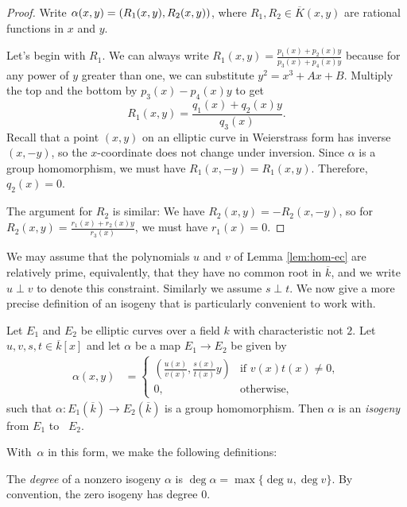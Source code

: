 \begin{proof}
Write $\alpha(x,y)=(R_1(x,y),R_2(x,y))$, where $R_1,R_2\in  \overline{K}(x,y)$ are rational functions in $x$ and $y$.

Let's begin with $R_1$.  We can always write $R_1(x,y) = \frac{p_1(x)+p_2(x)y}{p_3(x)+p_4(x)y}$ because for any power of $y$ greater than one, we can substitute $y^2 = x^3+Ax+B$.  Multiply the top and the bottom by $p_3(x)-p_4(x)y$ to get \[R_1(x,y) = \frac{q_1(x)+q_2(x)y}{q_3(x)}.\]
Recall that a point $(x,y)$ on an elliptic curve in Weierstrass form has inverse $(x,-y)$, so the $x$-coordinate does not change under inversion. Since $\alpha$ is a group homomorphism, we must have $R_1(x,-y) = R_1(x,y)$.  Therefore, $q_2(x) = 0$.

The argument for $R_2$ is similar:  We have $R_2(x,y) = -R_2(x,-y)$, so for $R_2(x,y) = \frac{r_1(x)+r_2(x)y}{r_3(x)}$, we must have $r_1(x) = 0$.
\end{proof}

We may assume that the polynomials $u$ and $v$ of Lemma \ref{lem:hom-ec} are relatively prime, equivalently, that they have no common root in $\overline{k}$, and we write $u\perp v$ to denote this constraint.  Similarly we assume $s\perp t$.
We now give a more precise definition of an isogeny that is particularly convenient to work with.

\begin{df}
Let $E_1$ and $E_2$ be elliptic curves over a field $k$ with characteristic not $2$.  Let $u,v,s,t \in \overline{k}[x]$ and let $\alpha$ be a map $E_1 \rightarrow E_2$ be given by
\begin{align*}
\alpha(x,y) &= 
	\begin{cases}
	\left(\frac{u(x)}{v(x)},\frac{s(x)}{t(x)}y\right) & \text{if } v(x)t(x) \neq 0,\\
	0, & \text{otherwise, }
	\end{cases}
\end{align*}
such that $\alpha\colon E_1(\overline{k}) \rightarrow E_2(\overline{k})$ is a group homomorphism.  Then $\alpha$ is an \emph{isogeny} from $E_1$ to~ $E_2$.
\end{df}

With~$\alpha$ in this form, we make the following definitions:

\begin{df}\label{df:degree-elem}
The \emph{degree} of a nonzero isogeny $\alpha$ is $\deg \alpha= \max \{\deg u, \deg v\}$.
By convention, the zero isogeny has degree 0.
\end{df}

